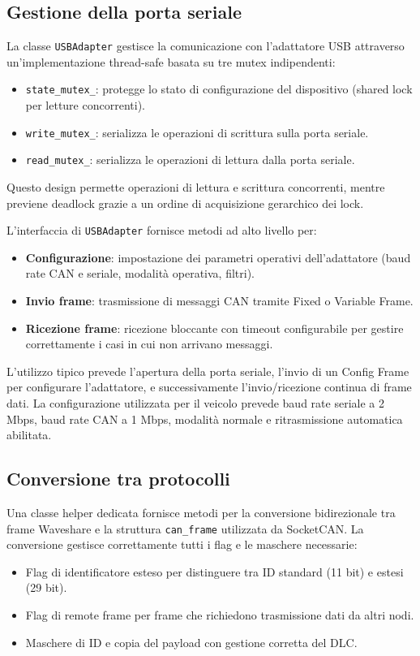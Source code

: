 \subsection{Gestione della porta seriale}

La classe \texttt{USBAdapter} gestisce la comunicazione con l'adattatore USB attraverso un'implementazione thread-safe basata su tre mutex indipendenti:

\begin{itemize}
    \item \texttt{state\_mutex\_}: protegge lo stato di configurazione del dispositivo (shared lock per letture concorrenti).
    \item \texttt{write\_mutex\_}: serializza le operazioni di scrittura sulla porta seriale.
    \item \texttt{read\_mutex\_}: serializza le operazioni di lettura dalla porta seriale.
\end{itemize}

Questo design permette operazioni di lettura e scrittura concorrenti, mentre previene deadlock grazie a un ordine di acquisizione gerarchico dei lock.

L'interfaccia di \texttt{USBAdapter} fornisce metodi ad alto livello per:
\begin{itemize}
    \item \textbf{Configurazione}: impostazione dei parametri operativi dell'adattatore (baud rate CAN e seriale, modalità operativa, filtri).
    \item \textbf{Invio frame}: trasmissione di messaggi CAN tramite Fixed o Variable Frame.
    \item \textbf{Ricezione frame}: ricezione bloccante con timeout configurabile per gestire correttamente i casi in cui non arrivano messaggi.
\end{itemize}

L'utilizzo tipico prevede l'apertura della porta seriale, l'invio di un Config Frame per configurare l'adattatore, e successivamente l'invio/ricezione continua di frame dati. La configurazione utilizzata per il veicolo prevede baud rate seriale a 2 Mbps, baud rate CAN a 1 Mbps, modalità normale e ritrasmissione automatica abilitata.

\subsection{Conversione tra protocolli}

Una classe helper dedicata fornisce metodi per la conversione bidirezionale tra frame Waveshare e la struttura \texttt{can\_frame} utilizzata da SocketCAN. La conversione gestisce correttamente tutti i flag e le maschere necessarie:
\begin{itemize}
    \item Flag di identificatore esteso per distinguere tra ID standard (11 bit) e estesi (29 bit).
    \item Flag di remote frame per frame che richiedono trasmissione dati da altri nodi.
    \item Maschere di ID e copia del payload con gestione corretta del DLC.
\end{itemize}

